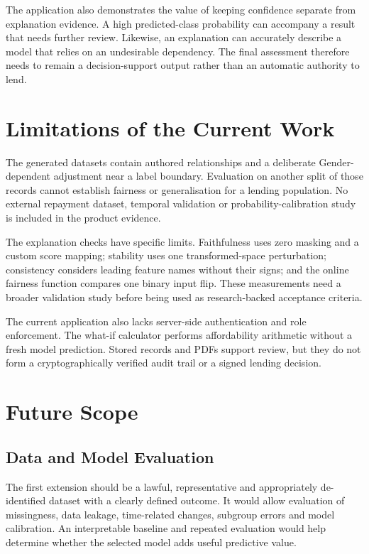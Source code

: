 The application also demonstrates the value of keeping confidence separate from explanation evidence. A high predicted-class probability can accompany a result that needs further review. Likewise, an explanation can accurately describe a model that relies on an undesirable dependency. The final assessment therefore needs to remain a decision-support output rather than an automatic authority to lend.

\section{Limitations of the Current Work}
The generated datasets contain authored relationships and a deliberate Gender-dependent adjustment near a label boundary. Evaluation on another split of those records cannot establish fairness or generalisation for a lending population. No external repayment dataset, temporal validation or probability-calibration study is included in the product evidence.

The explanation checks have specific limits. Faithfulness uses zero masking and a custom score mapping; stability uses one transformed-space perturbation; consistency considers leading feature names without their signs; and the online fairness function compares one binary input flip. These measurements need a broader validation study before being used as research-backed acceptance criteria.

The current application also lacks server-side authentication and role enforcement. The what-if calculator performs affordability arithmetic without a fresh model prediction. Stored records and PDFs support review, but they do not form a cryptographically verified audit trail or a signed lending decision.

\section{Future Scope}
\subsection{Data and Model Evaluation}
The first extension should be a lawful, representative and appropriately de-identified dataset with a clearly defined outcome. It would allow evaluation of missingness, data leakage, time-related changes, subgroup errors and model calibration. An interpretable baseline and repeated evaluation would help determine whether the selected model adds useful predictive value.

